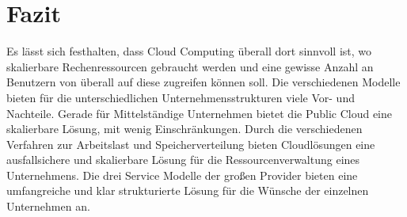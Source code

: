 \section{Fazit}
Es lässt sich festhalten, dass Cloud Computing überall dort sinnvoll ist, wo skalierbare Rechenressourcen gebraucht werden und eine gewisse Anzahl an Benutzern von überall auf diese zugreifen können soll.
Die verschiedenen Modelle bieten für die unterschiedlichen Unternehmensstrukturen viele Vor- und Nachteile. Gerade für Mittelständige Unternehmen bietet die Public Cloud eine skalierbare Lösung, mit wenig Einschränkungen. Durch die verschiedenen Verfahren zur Arbeitslast und Speicherverteilung bieten Cloudlösungen eine ausfallsichere und skalierbare Lösung für die Ressourcenverwaltung eines Unternehmens. Die drei Service Modelle der großen Provider bieten eine umfangreiche und klar strukturierte Lösung für die Wünsche der einzelnen Unternehmen an.

